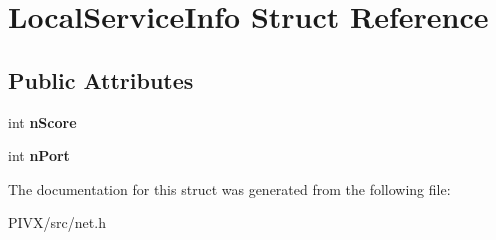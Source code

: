 \hypertarget{struct_local_service_info}{}\section{Local\+Service\+Info Struct Reference}
\label{struct_local_service_info}
\subsection*{Public Attributes}
\begin{DoxyCompactItemize}
\item 
\mbox{\label{struct_local_service_info_ad6a9d404fb109ba1506df3f6ca842ed5}} 
int {\bfseries n\+Score}
\item 
\mbox{\label{struct_local_service_info_aa5c39fec8cc69a43e393bb158f69224b}} 
int {\bfseries n\+Port}
\end{DoxyCompactItemize}


The documentation for this struct was generated from the following file\+:\begin{DoxyCompactItemize}
\item 
P\+I\+V\+X/src/net.\+h\end{DoxyCompactItemize}

